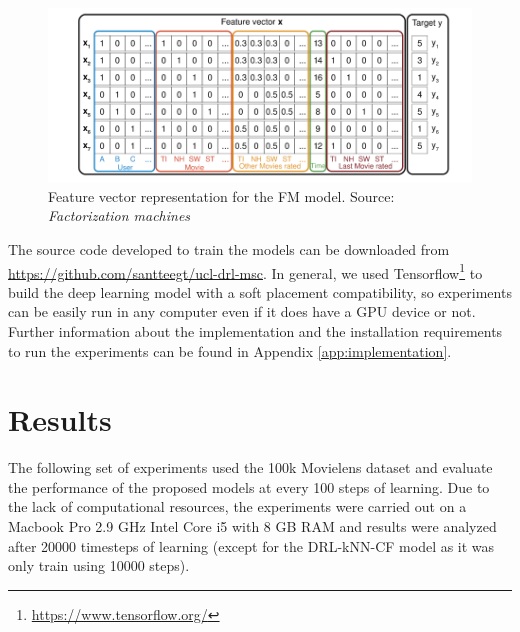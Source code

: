 \begin{figure}[t]
\centering
\includegraphics[scale=0.9]{images/featurevectors}
\caption{Feature vector representation for the FM model. Source: \textit{Factorization machines} \cite{rendle2010factorization}}
\label{fig:featurevector}
\end{figure}

The source code developed to train the models can be downloaded from \url{https://github.com/santteegt/ucl-drl-msc}. In general, we used Tensorflow\footnote{\url{https://www.tensorflow.org/}} to build the deep learning model with a soft placement compatibility, so experiments can be easily run in any computer even if it does have a GPU device or not.  Further information about the implementation and the installation requirements to run the experiments can be found in Appendix \ref{app:implementation}.

\section{Results}

The following set of experiments used the 100k Movielens dataset and evaluate the performance of the proposed models at every 100 steps of learning. Due to the lack of computational resources, the experiments were carried out on a Macbook Pro 2.9 GHz Intel Core i5 with 8 GB RAM and results were analyzed after 20000 timesteps of learning (except for the DRL-kNN-CF model as it was only train using 10000 steps). 

